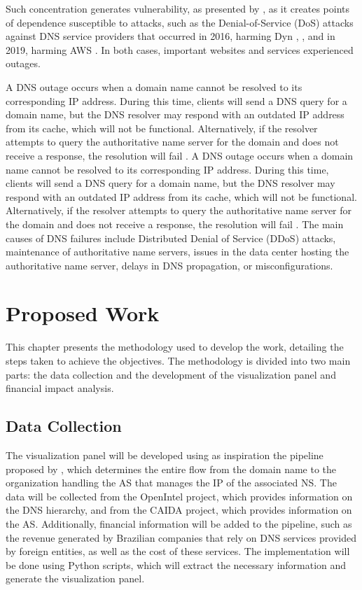 \documentclass[12pt]{article}
\begin{document}
Such concentration generates vulnerability, as presented by \cite{moura:20}, as it creates points of dependence susceptible to attacks, such as the Denial-of-Service (DoS) attacks against DNS service providers that occurred in 2016, harming Dyn \cite{hilton:16}, \cite{chacos:16}, and in 2019, harming AWS \cite{williams:19}. In both cases, important websites and services experienced outages.

A DNS outage occurs when a domain name cannot be resolved to its corresponding IP address. During this time, clients will send a DNS query for a domain name, but the DNS resolver may respond with an outdated IP address from its cache, which will not be functional. Alternatively, if the resolver attempts to query the authoritative name server for the domain and does not receive a response, the resolution will fail \cite{pramatarov:24}. 
A DNS outage occurs when a domain name cannot be resolved to its corresponding IP address. During this time, clients will send a DNS query for a domain name, but the DNS resolver may respond with an outdated IP address from its cache, which will not be functional. Alternatively, if the resolver attempts to query the authoritative name server for the domain and does not receive a response, the resolution will fail \cite{pramatarov:24}. The main causes of DNS failures include Distributed Denial of Service (DDoS) attacks, maintenance of authoritative name servers, issues in the data center hosting the authoritative name server, delays in DNS propagation, or misconfigurations.


\section{Proposed Work}

This chapter presents the methodology used to develop the work, detailing the steps taken to achieve the objectives. The methodology is divided into two main parts: the data collection and the development of the visualization panel and financial impact analysis.

\subsection{Data Collection}

The visualization panel will be developed using as inspiration the pipeline proposed by \cite{azevedo:24}, which determines the entire flow from the domain name to the organization handling the AS that manages the IP of the associated NS. The data will be collected from the OpenIntel project, which provides information on the DNS hierarchy, and from the CAIDA project, which provides information on the AS. Additionally, financial information will be added to the pipeline, such as the revenue generated by Brazilian companies that rely on DNS services provided by foreign entities, as well as the cost of these services. The implementation will be done using Python scripts, which will extract the necessary information and generate the visualization panel.
 
\end{document}
